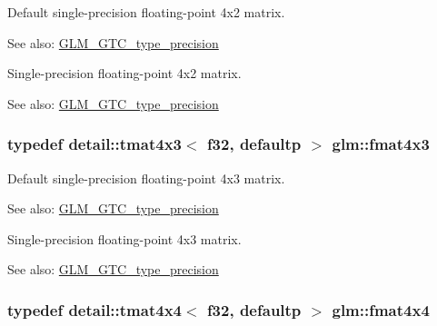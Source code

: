 Default single-precision floating-point 4x2 matrix. \begin{Desc}
\item[See also:]\hyperlink{group__gtc__type__precision}{GLM\_\-GTC\_\-type\_\-precision}\end{Desc}
Single-precision floating-point 4x2 matrix. \begin{Desc}
\item[See also:]\hyperlink{group__gtc__type__precision}{GLM\_\-GTC\_\-type\_\-precision} \end{Desc}
\hypertarget{group__gtc__type__precision_g5af77d2574bca528d321fbf261c90107}{
\subsubsection[fmat4x3]{\setlength{\rightskip}{0pt plus 5cm}typedef detail::tmat4x3$<$ f32, defaultp $>$ {\bf glm::fmat4x3}}}
\label{group__gtc__type__precision_g5af77d2574bca528d321fbf261c90107}


Default single-precision floating-point 4x3 matrix. \begin{Desc}
\item[See also:]\hyperlink{group__gtc__type__precision}{GLM\_\-GTC\_\-type\_\-precision}\end{Desc}
Single-precision floating-point 4x3 matrix. \begin{Desc}
\item[See also:]\hyperlink{group__gtc__type__precision}{GLM\_\-GTC\_\-type\_\-precision} \end{Desc}
\hypertarget{group__gtc__type__precision_ga641dae0fcc277f028b4e48e16bbea86}{
\subsubsection[fmat4x4]{\setlength{\rightskip}{0pt plus 5cm}typedef detail::tmat4x4$<$ f32, defaultp $>$ {\bf glm::fmat4x4}}}
\label{group__gtc__type__precision_ga641dae0fcc277f028b4e48e16bbea86}


